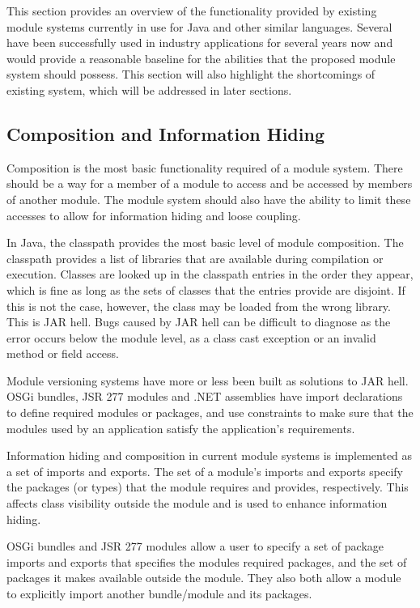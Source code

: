 This section provides an overview of the functionality provided by existing module systems currently 
in use for Java and other similar languages. 
Several \cite{javajars, OSGi4, netassemblies} have been successfully used in industry 
applications for several years now and would provide a reasonable baseline
for the abilities that the proposed module system should possess. This section will also
highlight the shortcomings of existing system, which will be addressed in later sections.

\subsection{Composition and Information Hiding}

Composition is the most basic functionality required of a module system. There
should be a way for a member of a module to access and be accessed by members of
another module. The module system should also have the ability to limit
these accesses to allow for information hiding and loose coupling.

In Java, the classpath provides the most basic level of module composition. 
The classpath provides a list of libraries that are
available during compilation or execution. Classes are looked up in the 
classpath entries in the order they appear, which is fine as long as the sets 
of classes that the entries provide are disjoint. If this is not the case, however, the class may
be loaded from the wrong library. This is JAR hell. Bugs caused by JAR hell
can be difficult to diagnose as the error occurs below the module level, as 
a class cast exception or an invalid method or field access.

Module versioning systems have more or less been built as solutions to JAR hell. 
OSGi \cite{OSGi4} bundles, JSR 277 modules \cite{JSR277} and .NET assemblies \cite{netassemblies}
have import declarations to define required modules or packages, and use constraints 
to make sure that the modules used by an application satisfy the 
application's requirements. 

Information hiding and composition in current module systems is
implemented as a set of imports and exports.
The set of a module's imports and exports specify the packages (or types) that
the module requires and provides, respectively. This affects class
visibility outside the module and is used to enhance information hiding. 

OSGi bundles and JSR 277 modules allow a user to specify a set of package imports 
and exports that specifies the modules required packages, and the set of packages 
it makes available outside the module. They also both allow a module
to explicitly import another bundle/module and its packages.

